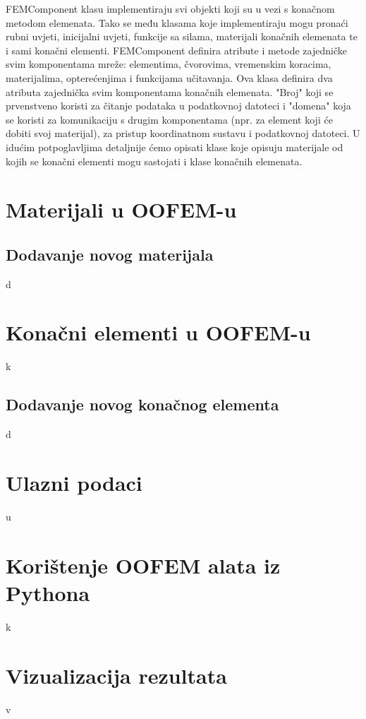 \documentclass[a4paper,twoside,12pt]{memoir} %
\begin{document}
FEMComponent klasu implementiraju svi objekti koji su u vezi s konačnom metodom elemenata. Tako se među klasama koje implementiraju mogu pronaći rubni uvjeti, inicijalni uvjeti, funkcije sa silama, materijali konačnih elemenata te i sami konačni elementi. FEMComponent definira atribute i metode zajedničke svim komponentama mreže: elementima, čvorovima, vremenskim koracima, materijalima, opterećenjima i funkcijama učitavanja. Ova klasa definira dva atributa zajednička svim komponentama konačnih elemenata. "Broj" koji se prvenstveno koristi za čitanje podataka u podatkovnoj datoteci i "domena" koja se koristi za komunikaciju s drugim komponentama (npr. za element koji će dobiti svoj materijal), za pristup koordinatnom sustavu i podatkovnoj datoteci. U idućim potpoglavljima detaljnije ćemo opisati klase koje opisuju materijale od kojih se konačni elementi mogu sastojati i klase konačnih elemenata.


\section{Materijali u OOFEM-u}
\label{poglavlje:materials_in_oofem}

\subsection{Dodavanje novog materijala}
d

\section{Konačni elementi u OOFEM-u}
k
\subsection{Dodavanje novog konačnog elementa}
d

\section{Ulazni podaci}
u

\section{Korištenje OOFEM alata iz Pythona}
\label{poglavlje:koristenje_pythona}
k

\section{Vizualizacija rezultata}
v
\end{document}
